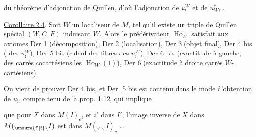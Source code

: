 
du théorème d'adjonction de Quillen, d'où
l'adjonction de $u_!^W$ et de $u^*_{W}$, .

\uline{Corollaire 2.4}. Soit  $W$ un localiseur
de $M$, tel qu'il existe un  triple
de Quillen spécial $(W,C,F)$ induisant $W$.
Alors le prédérivateur  $\operatorname{Ho}_W$  satisfait
aux axiomes Der 1 (décomposition), Der 2
(localisation), Der 3 (objet final), Der 4 bis
( des $u_!^W$), Der 5 bis (calcul des
fibres des $u_!^W$), Der 6 bis (exactitude
à gauche,  des carrés cocartésiens  les $\operatorname{Ho}_W(1)$),
Der 6 (exactitude à droite  carrés $W$-cartésiens).

On vient de prouver Der 4 bis, et Der. 5 bis
est  contenu dans le mode d'obtention de 
$u_!$, compte tenu de la prop. 1.12, qui implique

que pour 
 $X$ dans $M(I)_c$, et $i'$ dans $I'$, l'image inverse
de $X$ dans $M({}_{\unsure{i'|i}\backslash}I)$ est dans $M({}_{i'\backslash}I)_c$ \ldots.
